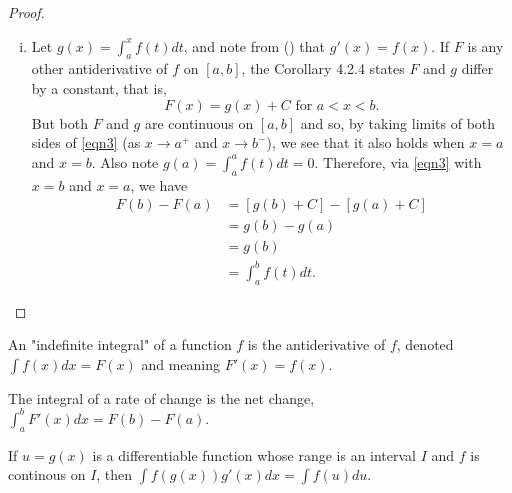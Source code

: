 \documentclass[a4paper,8pt]{article}
\begin{document}
\begin{outline}
\begin{proof}
\begin{enumerate}[i.]
          A similar proof of equation \eqref{eqn2} holds for \(h < 0\). Now let \(h\rightarrow 0\) which means
          \(u\rightarrow x\) and \(v\rightarrow x\) since \(u, v\in [x, x+h]\). Therefore \(\xlimit{h}{0}f(u) =
          \xlimit{u}{x}f(u)=f(x)\) and \(\xlimit{h}{0}f(v)=\xlimit{v}{x}f(v)=f(x)\). Then by equation \eqref{eqn2}
          and the Squeeze Theorem, \(g'(x) = \xlimit{h}{0}\frac{g(x+h)-g(x)}{h} = f(x)\). If \(x=a\) or \(x=b\),
          we consider \(g'(x)\) as a one sided-limit. Regardless, because \(g\) is differentiable, then \(g\) is
          continous on \([a,b]\).
        \item
          Let \(g(x)=\int_a^xf(t)dt\), and note from () that \(g'(x) = f(x)\). If \(F\) is any other
          antiderivative of \(f\) on \([a, b]\), the Corollary 4.2.4 states \(F\) and \(g\) differ by a constant,
          that is,
          \begin{equation}
            \label{eqn3}
            F(x) = g(x) + C\text{ for }a < x < b\text{.}
          \end{equation}
          But both \(F\) and \(g\) are continuous on \([a, b]\) and so, by taking limits of both sides of
          \eqref{eqn3} (as \(x\rightarrow a^{+}\) and \(x\rightarrow b^{-}\)), we see that it also holds when
          \(x = a\) and \(x = b\). Also note \(g(a) = \int_a^a f(t)dt = 0\). Therefore, via \eqref{eqn3}
          with \(x=b\) and \(x=a\), we have
          \begin{align*}
            F(b)-F(a) &= [g(b) + C] - [g(a) + C]\\
                      &= g(b)-g(a)\\
                      &= g(b)\\
                      &= \int_a^bf(t)dt\text{.}
          \end{align*}
      \end{enumerate}
    \end{proof}

    An "indefinite integral" of a function \(f\) is the antiderivative of \(f\), denoted \(\int f(x)dx=F(x)\)
    and meaning \(F'(x)=f(x)\).

    The integral of a rate of change is the net change, \(\int_a^bF'(x)dx = F(b)-F(a)\).

    If \(u=g(x)\) is a differentiable function whose range is an interval \(I\) and \(f\) is continous
    on \(I\), then \(\int f(g(x))g'(x)dx = \int f(u)du\).


\end{outline}
\end{document}
